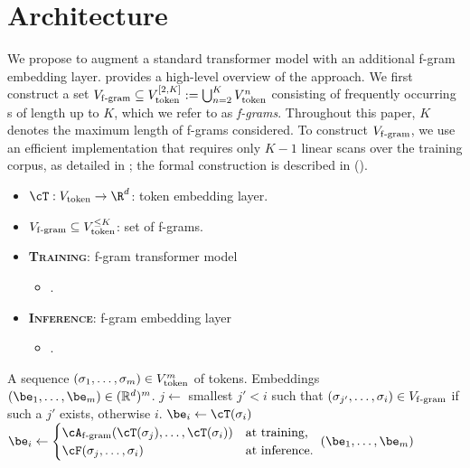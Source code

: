 
\section{\SCONE Architecture}
\label{sec:method}

We propose to augment a standard transformer model with an additional f-gram embedding layer.  provides a high-level overview of the approach. We first construct a set $V_{\mathrm{f\text{-}gram}} \subseteq V_{\mathrm{token}}^{[2, K]} := \bigcup_{n=2}^K V_{\mathrm{token}}^{n}$ consisting of frequently occurring s of length up to $K$, which we refer to as \emph{f-grams}. Throughout this paper, $K$ denotes the maximum length of f-grams considered. 
To construct $V_{\mathrm{f\text{-}gram}}$, we use an efficient implementation that requires only $K-1$ linear scans over the training corpus, as detailed in ; the formal construction is described in  ().

{\renewcommand{\baselinestretch}{1.22}\selectfont
\begin{algorithm}[t]
\small
\caption{\SCONE method $F_{\cT, \Vfgram, \train{\Afgram} | \infer{\cF}}$.}
\label{alg:scone-first-stage}
\begin{algorithmic}
\STATE \begin{itemize}[itemsep=-2pt]
    \item $\cT : \Vtoken \to \R^d$: token embedding layer.
    \item $V_{\mathrm{f\text{-}gram}} \subseteq V_{\mathrm{token}}^{\le K}$: set of f-grams.
    \item \textbf{\textsc{Training}}: f-gram transformer model
    \begin{itemize}[leftmargin=8mm,label=$\triangleright$,itemsep=-3pt,topsep=-4pt]
        \item {}.
    \end{itemize}
    \item \textbf{\textsc{Inference}}: f-gram embedding layer
    \begin{itemize}[leftmargin=8mm,label=$\triangleright$,itemsep=-3pt,topsep=-4pt]
        \item {}.
    \end{itemize}
\end{itemize}
 A sequence $(\sigma_1, \ldots, \sigma_m) \in V_{\mathrm{token}}^m$ of tokens.
 Embeddings $(\be_1, \ldots, \be_m) \in (\mathbb{R}^d)^m$.
    \STATE $j \gets$ smallest $j' < i$ such that $(\sigma_{j'}, \ldots, \sigma_i) \in V_{\mathrm{f\text{-}gram}}$ if such a $j'$ exists, otherwise $i$.
        \STATE $\be_i \gets \cT(\sigma_i)$
    \ELSE
        \STATE $\be_i \gets \begin{cases}
            \Afgram(\cT(\sigma_{j}), \ldots, \cT(\sigma_i)) & \text{at training,}\\
            \cF(\sigma_{j}, \ldots, \sigma_i) & \text{at inference.}
        \end{cases}$
    \ENDIF
\ENDFOR
\RETURN $(\be_1, \ldots, \be_m)$
\end{algorithmic}
\end{algorithm}
}

